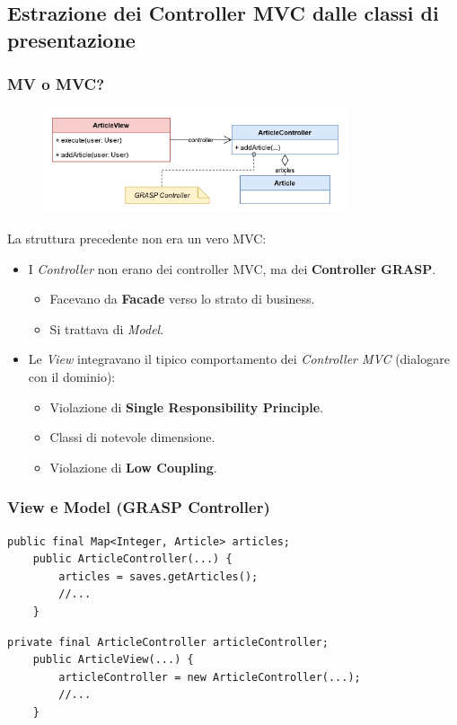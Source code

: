 \subsection{Estrazione dei Controller MVC dalle classi di presentazione}
\begin{frame}
  \frametitle{MV o MVC?}
  \begin{figure}
    \includegraphics[width=0.8\textwidth]{img/MV.png}
  \end{figure}

  La struttura precedente {\color{red}non era un vero MVC}:
  \begin{itemize}
    \item I \emph{Controller} non erano dei controller MVC, ma dei \textbf{Controller GRASP}.
    \begin{itemize}
      \item Facevano da \textbf{Facade} verso lo strato di business.
      \item Si trattava di \emph{Model}.
    \end{itemize}
    \item Le \emph{View} integravano il tipico comportamento dei \emph{Controller MVC} (dialogare
    con il dominio):
    \begin{itemize}
      \item Violazione di \textbf{Single Responsibility Principle}.
      \item Classi di notevole dimensione.
      \item Violazione di \textbf{Low Coupling}.
    \end{itemize}
  \end{itemize}
\end{frame}

\begin{frame} [fragile]
    \frametitle{View e Model (GRASP Controller)}
    \begin{lstlisting}[autogobble, title={\texttt{ArticleController.java}}]
    public final Map<Integer, Article> articles;
    public ArticleController(...) {
        articles = saves.getArticles();
        //...
    }
    \end{lstlisting}
    \begin{lstlisting}[autogobble, title={\texttt{ArticleView.java}}]
    private final ArticleController articleController;
    public ArticleView(...) {
        articleController = new ArticleController(...);
        //...
    }
    \end{lstlisting}
\end{frame}

